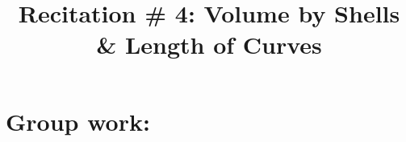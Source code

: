 \documentclass[handout]{ximera}
\title{Recitation \# 4: Volume by Shells \& Length of Curves}
\begin{document}
\begin{abstract}		\end{abstract}
\maketitle

\section{Group work:}
\end{document}

